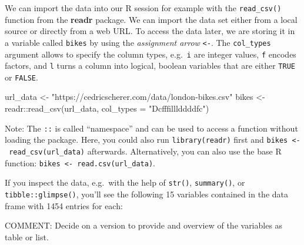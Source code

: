 \documentclass[
]{krantz}
\makeatletter
\newenvironment{Shaded}{\begin{snugshade}}{\end{snugshade}}
\newcommand{\AttributeTok}[1]{\textcolor[rgb]{0.61,0.61,0.61}{#1}}
\newcommand{\FunctionTok}[1]{\textcolor[rgb]{0,0,0}{#1}}
\newcommand{\NormalTok}[1]{#1}
\newcommand{\OtherTok}[1]{\textcolor[rgb]{0.37,0.37,0.37}{#1}}
\newcommand{\SpecialCharTok}[1]{\textcolor[rgb]{0,0,0}{#1}}
\newcommand{\StringTok}[1]{\textcolor[rgb]{0.5,0.5,0.5}{#1}}
\newenvironment{kframe}{%
\medskip{}
\setlength{\fboxsep}{.8em}
 \def\at@end@of@kframe{}%
 \ifinner\ifhmode%
  \def\at@end@of@kframe{\end{minipage}}%
  \begin{minipage}{\columnwidth}%
 \fi\fi%
 \def\FrameCommand##1{\hskip\@totalleftmargin \hskip-\fboxsep
 \colorbox{shadecolor}{##1}\hskip-\fboxsep
     \hskip-\linewidth \hskip-\@totalleftmargin \hskip\columnwidth}%
 \MakeFramed {\advance\hsize-\width
   \@totalleftmargin\z@ \linewidth\hsize
   \@setminipage}}%
 {\par\unskip\endMakeFramed%
 \at@end@of@kframe}
\renewenvironment{Shaded}{\begin{kframe}}{\end{kframe}}
\makeatother
\begin{document}
We can import the data into our R session for example with the \texttt{read\_csv()} function from the \textbf{readr} package. We can import the data set either from a local source or directly from a web URL. To access the data later, we are storing it in a variable called \texttt{bikes} by using the \emph{assignment arrow} \texttt{\textless{}-}. The \texttt{col\_types} argument allows to specify the column types, e.g.~\texttt{i} are integer values, \texttt{f} encodes factors, and \texttt{l} turns a column into logical, boolean variables that are either \texttt{TRUE} or \texttt{FALSE}.

\begin{Shaded}
\begin{Highlighting}[]
\NormalTok{url\_data }\OtherTok{\textless{}{-}} \StringTok{"https://cedricscherer.com/data/london{-}bikes.csv"}
\NormalTok{bikes }\OtherTok{\textless{}{-}}\NormalTok{ readr}\SpecialCharTok{::}\FunctionTok{read\_csv}\NormalTok{(url\_data, }\AttributeTok{col\_types =} \StringTok{"Dcfffilllddddfc"}\NormalTok{)}
\end{Highlighting}
\end{Shaded}

Note: The \texttt{::} is called ``namespace'' and can be used to access a function without loading the package. Here, you could also run \texttt{library(readr)} first and \texttt{bikes\ \textless{}-\ read\_csv(url\_data)} afterwards. Alternatively, you can also use the base R function: \texttt{bikes\ \textless{}-\ read.csv(url\_data)}.

If you inspect the data, e.g.~with the help of \texttt{str()}, \texttt{summary()}, or \texttt{tibble::glimpse()}, you'll see the following 15 variables contained in the data frame with 1454 entries for each:

COMMENT: Decide on a version to provide and overview of the variables as table or list.
\end{document}
